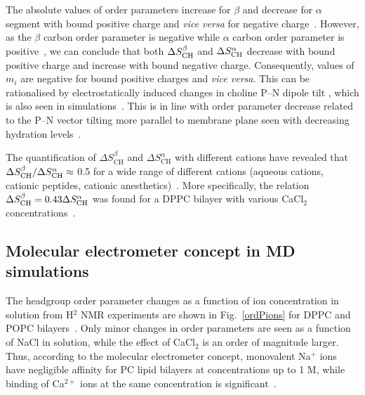 \documentclass[twoside,twocolumn,9pt]{article}
\begin{document}
The absolute values of order parameters 
increase for $\beta$ and decrease for $\alpha$ segment with bound positive charge
and {\it vice versa} for negative charge~\cite{akutsu81,altenbach84,altenbach85,seelig87,scherer89,rydall92}. 
However, as the $\beta$ carbon order parameter is negative while $\alpha$ carbon order parameter is 
positive~\cite{hong95a,hong95b,gross97}, we can conclude 
that both $\Delta S_{\rm{CH}}^{\beta}$ and $\Delta S_{\rm{CH}}^{\alpha}$ decrease with bound positive charge 
and increase with bound negative charge. Consequently, values of $m_i$ are negative for
bound positive charges and {\it vice versa}. This can be rationalised by electrostatically 
induced changes in choline P--N dipole tilt \cite{seelig87,scherer89,seelig90}, which is also
seen in simulations~\cite{gurtovenko05,cordomi08,cordomi09,zhao12}. 
This is in line with order parameter decrease related to the P--N vector tilting more parallel to membrane plane seen with decreasing hydration levels~\cite{botan15}. 


The quantification of $\Delta S_\mathrm{CH}^\beta$ and $\Delta S_\mathrm{CH}^\alpha$
with different cations
have revealed that $\Delta S_{\rm{CH}}^{\beta}/\Delta S_{\rm{CH}}^{\alpha} \approx$ 0.5 for a wide range
of different cations (aqueous cations, cationic peptides, cationic anesthetics)~\cite{beschiasvili91,rydall92}.
More specifically,
the relation $\Delta S_{\rm{CH}}^{\beta}=0.43 \Delta S_{\rm{CH}}^{\alpha}$ was found for a DPPC bilayer
with various CaCl$_2$ concentrations~\cite{akutsu81}.


\subsection{Molecular electrometer concept in MD simulations}\label{electrometerinsimulations}

The headgroup order parameter changes as a function of ion concentration in
solution from H$^2$ NMR experiments are shown in Fig.~\ref{ordPions} for DPPC and POPC bilayers~\cite{akutsu81,altenbach84}.
Only minor changes in order parameters are seen
as a function of NaCl in solution, 
while the effect of CaCl$_2$ is an order of magnitude larger. 
Thus, according to the molecular electrometer concept, 
monovalent Na$^+$ ions have negligible affinity for PC lipid bilayers at concentrations up to 1 M,
while binding of Ca$^{2+}$ ions at the same concentration is significant~\cite{akutsu81,altenbach84}. 
\end{document}
